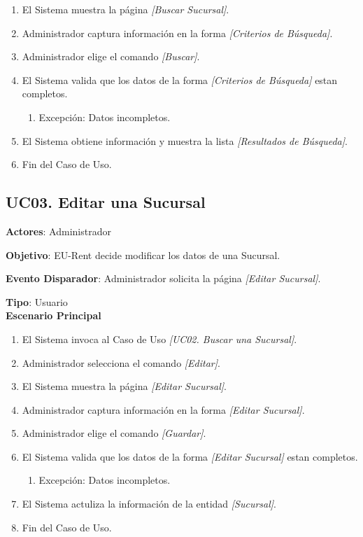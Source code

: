 \begin{enumerate}
\item El Sistema muestra la página \textit{[Buscar Sucursal]}.
\item Administrador captura información en la forma \textit{[Criterios de Búsqueda]}.
\item Administrador elige el comando \textit{[Buscar]}.
\item El Sistema valida que los datos de la forma \textit{[Criterios de Búsqueda]} estan completos.
	\begin{enumerate}
		\item Excepción: Datos incompletos.
	\end{enumerate}
\item El Sistema obtiene información y muestra la lista \textit{[Resultados de Búsqueda]}.
\item Fin del Caso de Uso.
\end{enumerate}
\subsection{UC03. Editar una Sucursal} \label{EditarSucursal}
\textbf{Actores}: Administrador

\textbf{Objetivo}: EU-Rent decide modificar los datos de una Sucursal.

\textbf{Evento Disparador}: Administrador solicita la página \textit{[Editar Sucursal]}.

\textbf{Tipo}: Usuario\\

\textbf{Escenario Principal}

\begin{enumerate}
\item El Sistema invoca al Caso de Uso \textit{[UC02. Buscar una Sucursal]}.
\item Administrador selecciona el comando \textit{[Editar]}.
\item El Sistema muestra la página \textit{[Editar Sucursal]}.
\item Administrador captura información en la forma \textit{[Editar Sucursal]}.
\item Administrador elige el comando \textit{[Guardar]}.
\item El Sistema valida que los datos de la forma \textit{[Editar Sucursal]} estan completos.
	\begin{enumerate}
		\item Excepción: Datos incompletos.
	\end{enumerate}
\item El Sistema actuliza la información de la entidad \textit{[Sucursal]}.
\item Fin del Caso de Uso.
\end{enumerate}
